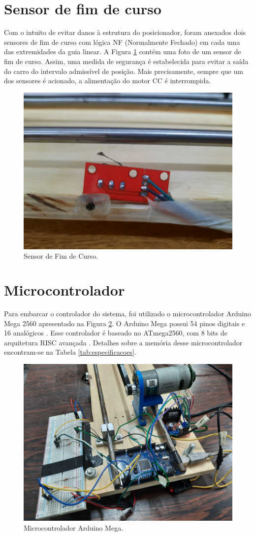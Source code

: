 \section{Sensor de fim de curso}
Com o intuito de evitar danos à estrutura do posicionador, foram anexados dois sensores de fim de curso com lógica NF  (Normalmente Fechado) em cada uma das extremidades da guia linear. A Figura \ref{fig:sensor_fim} contém uma foto de um sensor de fim de curso. Assim, uma medida de segurança é estabelecida para evitar a saída do carro do intervalo admissível de posição. Mais precisamente, sempre que um dos sensores é acionado, a alimentação do motor CC é interrompida.

 \begin{figure}[H]
    \centering
    \includegraphics[width=0.5\linewidth]{figuras/fim_de_curso.jpg}
    \caption[Sensor de Fim de Curso]{Sensor de Fim de Curso.}
    \label{fig:sensor_fim}
\end{figure}

\section{Microcontrolador}
Para embarcar o controlador do sistema, foi utilizado o microcontrolador Arduino Mega 2560 apresentado na Figura \ref{fig:conexoes}. O Arduino Mega possui 54 pinos digitais e 16 analógicos \cite{Arduino}. Esse controlador é baseado no ATmega2560, com 8 bits de arquitetura RISC avançada \cite{ATmega2560}. Detalhes sobre a memória desse microcontrolador encontram-se na Tabela \ref{tab:especificacoes}.

 \begin{figure}[H]
    \centering
    \includegraphics[width=0.6\linewidth]{figuras/sistema_atuador.jpg}
    \caption[Microcontrolador Arduino Mega]{Microcontrolador Arduino Mega.}
    \label{fig:conexoes}
\end{figure}

